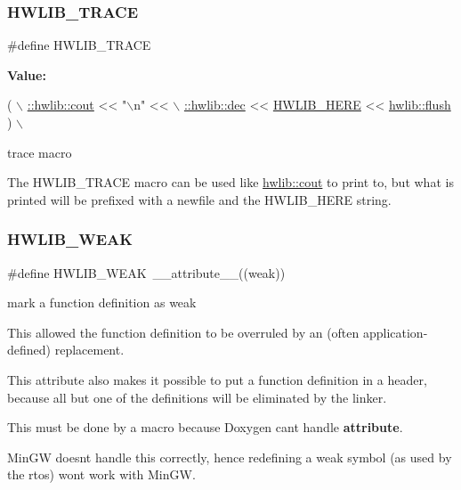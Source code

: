 \subsubsection{\texorpdfstring{H\+W\+L\+I\+B\+\_\+\+T\+R\+A\+CE}{HWLIB\_TRACE}}
{\footnotesize\ttfamily \#define H\+W\+L\+I\+B\+\_\+\+T\+R\+A\+CE}

{\bfseries Value\+:}
\begin{DoxyCode}
(                                 \(\backslash\)
   \hyperlink{namespacehwlib_a7de728368e57486f51717f911401a604}{::hwlib::cout} << \textcolor{stringliteral}{"\(\backslash\)n"} <<                           \(\backslash\)
   \hyperlink{namespacehwlib_ab8f3a2357c88d53861c09dbd17f14f1b}{::hwlib::dec} << \hyperlink{hwlib-defines_8hpp_a360fe3b1713068844a760bed1aa1384a}{HWLIB\_HERE} << \hyperlink{namespacehwlib_a648fe94ca9899747a632c23f97007732}{hwlib::flush} )       \(\backslash\)
\end{DoxyCode}
trace macro

The H\+W\+L\+I\+B\+\_\+\+T\+R\+A\+CE macro can be used like \hyperlink{namespacehwlib_a7de728368e57486f51717f911401a604}{hwlib\+::cout} to print to, but what is printed will be prefixed with a newfile and the H\+W\+L\+I\+B\+\_\+\+H\+E\+RE string. \mbox{\label{hwlib-defines_8hpp_a04be4340016df60d6636c1d1c6d94fc9}} 
\subsubsection{\texorpdfstring{H\+W\+L\+I\+B\+\_\+\+W\+E\+AK}{HWLIB\_WEAK}}
{\footnotesize\ttfamily \#define H\+W\+L\+I\+B\+\_\+\+W\+E\+AK~\+\_\+\+\_\+attribute\+\_\+\+\_\+((weak))}

mark a function definition as weak

This allowed the function definition to be overruled by an (often application-\/defined) replacement.

This attribute also makes it possible to put a function definition in a header, because all but one of the definitions will be eliminated by the linker.

This must be done by a macro because Doxygen can\textquotesingle{}t handle {\bfseries attribute}.

Min\+GW doesn\textquotesingle{}t handle this correctly, hence redefining a weak symbol (as used by the rtos) won\textquotesingle{}t work with Min\+GW. 